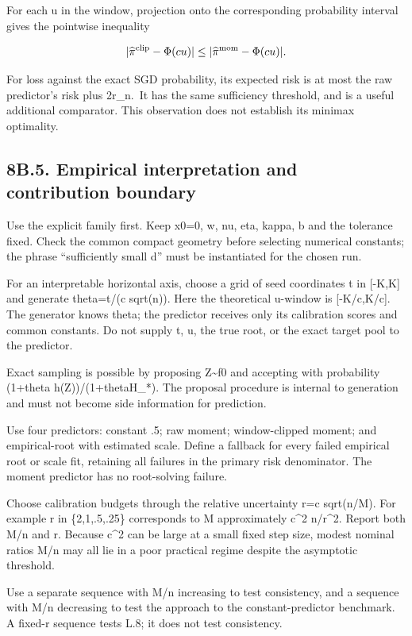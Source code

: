 For each u in the window, projection onto the corresponding probability
interval gives the pointwise inequality

\[
|\widehat\pi^{\rm clip}-\Phi(cu)|
\le |\widehat\pi^{\rm mom}-\Phi(cu)|.
\]

For loss against the exact SGD probability, its expected risk is at most
the raw predictor's risk plus 2r\_n.~It has the same sufficiency
threshold, and is a useful additional comparator. This observation does
not establish its minimax optimality.

\subsection{8B.5. Empirical interpretation and contribution
boundary}\label{local_prediction-b.5.-empirical-interpretation-and-contribution-boundary}

Use the explicit family first. Keep x0=0, w, nu, eta, kappa, b and the
tolerance fixed. Check the common compact geometry before selecting
numerical constants; the phrase ``sufficiently small d'' must be
instantiated for the chosen run.

For an interpretable horizontal axis, choose a grid of seed coordinates
t in {[}-K,K{]} and generate theta=t/(c sqrt(n)). Here the theoretical
u-window is {[}-K/c,K/c{]}. The generator knows theta; the predictor
receives only its calibration scores and common constants. Do not supply
t, u, the true root, or the exact target pool to the predictor.

Exact sampling is possible by proposing Z\textasciitilde f0 and
accepting with probability (1+theta
h(Z))/(1+\textbar theta\textbar H\_*). The proposal procedure is
internal to generation and must not become side information for
prediction.

Use four predictors: constant .5; raw moment; window-clipped moment; and
empirical-root with estimated scale. Define a fallback for every failed
empirical root or scale fit, retaining all failures in the primary risk
denominator. The moment predictor has no root-solving failure.

Choose calibration budgets through the relative uncertainty r=c
sqrt(n/M). For example r in \{2,1,.5,.25\} corresponds to M
approximately c\^{}2 n/r\^{}2. Report both M/n and r. Because c\^{}2 can
be large at a small fixed step size, modest nominal ratios M/n may all
lie in a poor practical regime despite the asymptotic threshold.

Use a separate sequence with M/n increasing to test consistency, and a
sequence with M/n decreasing to test the approach to the
constant-predictor benchmark. A fixed-r sequence tests L.8; it does not
test consistency.


